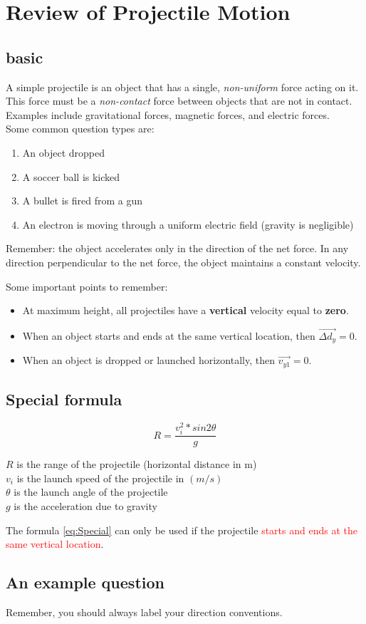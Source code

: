 \section{Review of Projectile Motion}
\subsection{basic}
A simple projectile is an object that has a single, \textit{non-uniform} force acting on it. This force must be a 
\textit{non-contact} force between objects that are not in contact. Examples include gravitational forces, magnetic forces,
and electric forces. \\

Some common question types are:
\begin{enumerate}
    \item An object dropped
    \item A soccer ball is kicked
    \item A bullet is fired from a gun 
    \item An electron is moving through a uniform electric field (gravity is negligible)
\end{enumerate}

Remember: the object accelerates only in the direction of the net force. In any direction perpendicular to the net force, 
the object maintains a constant velocity. 

Some important points to remember:
\begin{itemize}
    \item At maximum height, all projectiles have a \textbf{vertical} velocity equal to \textbf{zero}.
    \item When an object starts and ends at the same vertical location, then $\vec{\Delta d_{y}} = 0$.
    \item When an object is dropped or launched horizontally, then $\vec{v_{y1}} = 0$.
\end{itemize}

\subsection{Special formula}
\begin{equation} \label{eq:Special}
    R = \frac{ v_{i}^2 * sin{2\theta} }{g} 
\end{equation}
\begin{center}
    $R$ is the range of the projectile (horizontal distance in m) \\
    $v_{i}$ is the launch speed of the projectile in $(m/s)$ \\
    $\theta$ is the launch angle of the projectile \\
    $g$ is the acceleration due to gravity \\
\end{center}

The formula \ref{eq:Special} can only be used if the projectile \textcolor{red}{starts and ends at the same vertical location}.
\newpage
\subsection{An example question}
Remember, you should always label your direction conventions.


